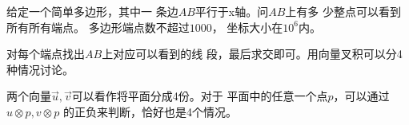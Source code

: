 \begin{prob}
	给定一个简单多边形，其中一
	条边$AB$平行于x轴。问$AB$上有多
	少整点可以看到所有所有端点。
	多边形端点数不超过$1000$，
	坐标大小在$10^6$内。
\end{prob}

\begin{sol}
	对每个端点找出$AB$上对应可以看到的线
	段，最后求交即可。用向量叉积可以分4种情况讨论。
	\par
	两个向量$\vec u,\vec v$可以看作将平面分成4份。对于
	平面中的任意一个点$p$，可以通过$u \otimes p, v \otimes p$
	的正负来判断，恰好也是4个情况。
\end{sol}
